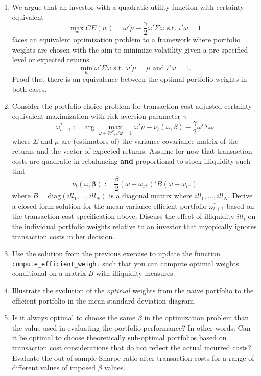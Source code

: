 \documentclass[
]{krantz}
\providecommand{\tightlist}{%
  \setlength{\itemsep}{0pt}\setlength{\parskip}{0pt}}
\begin{document}
\begin{enumerate}
\def\labelenumi{\arabic{enumi}.}
\tightlist
\item
  We argue that an investor with a quadratic utility function with certainty equivalent \[\max_w CE(w) = \omega'\mu - \frac{\gamma}{2} \omega'\Sigma \omega \text{ s.t. } \iota'\omega = 1\]
  faces an equivalent optimization problem to a framework where portfolio weights are chosen with the aim to minimize volatility given a pre-specified level or expected returns
  \[\min_w \omega'\Sigma \omega \text{ s.t. } \omega'\mu = \bar\mu \text{ and } \iota'\omega = 1. \] Proof that there is an equivalence between the optimal portfolio weights in both cases.
\item
  Consider the portfolio choice problem for transaction-cost adjusted certainty equivalent maximization with risk aversion parameter \(\gamma\)
  \[\omega_{t+1} ^* :=  \arg\max_{\omega \in \mathbb{R}^N,  \iota'\omega = 1} \omega'\mu - \nu_t (\omega, \beta) - \frac{\gamma}{2}\omega'\Sigma\omega\]
  where \(\Sigma\) and \(\mu\) are (estimators of) the variance-covariance matrix of the returns and the vector of expected returns. Assume for now that transaction costs are quadratic in rebalancing \textbf{and} proportional to stock illiquidity such that
  \[\nu_t\left(\omega, \mathbf{\beta}\right) := \frac{\beta}{2} \left(\omega - \omega_{t^+}\right)'B\left(\omega - \omega_{t^+}\right)\] where \(B = \text{diag}(ill_1, \ldots, ill_N)\) is a diagonal matrix where \(ill_1, \ldots, ill_N\). Derive a closed-form solution for the mean-variance efficient portfolio \(\omega_{t+1} ^*\) based on the transaction cost specification above. Discuss the effect of illiquidity \(ill_i\) on the individual portfolio weights relative to an investor that myopically ignores transaction costs in her decision.
\item
  Use the solution from the previous exercise to update the function \texttt{compute\_efficient\_weight} such that you can compute optimal weights conditional on a matrix \(B\) with illiquidity measures.
\item
  Illustrate the evolution of the \emph{optimal} weights from the naive portfolio to the efficient portfolio in the mean-standard deviation diagram.
\item
  Is it always optimal to choose the same \(\beta\) in the optimization problem than the value used in evaluating the portfolio performance? In other words: Can it be optimal to choose theoretically sub-optimal portfolios based on transaction cost considerations that do not reflect the actual incurred costs? Evaluate the out-of-sample Sharpe ratio after transaction costs for a range of different values of imposed \(\beta\) values.
\end{enumerate}
\end{document}
